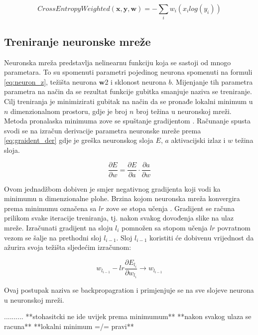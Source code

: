 \documentclass[times, utf8, zavrsni,numeric,pstricks]{fer}
\newcommand{\vect}[1]{\boldsymbol{#1}}
\begin{document}
\begin{equation}\label{eq:cross_entropy}
	CrossEntropyWeighted\left(\vect{x}, \vect{y},\vect{w}\right) =
		-\sum_i w_i \left( x_i log\left(y_i \right)\right)
\end{equation}

\subsection{Treniranje neuronske mreže}

Neuronska mreža predstavlja nelinearnu funkciju koja se sastoji od mnogo parametara. To su spomenuti parametri pojedinog neurona spomenuti na formuli \ref{eq:neuron_z}, težišta neurona $\vect{w}$2 i sklonost neurona $b$. Mijenjanje tih parametra parametra na način da se rezultat funkcije gubitka smanjuje naziva se treniranje. Cilj treniranja je minimizirati gubitak na način da se pronađe lokalni minimum u $n$ dimenzionalnom prostoru, gdje je broj $n$ broj težina u neuronskoj mreži. Metoda pronalaska minimuma zove se spuštanje gradijentom . Računanje spusta svodi se na izračun derivacije parametra neuronske mreže prema \ref{eq:graident_der} gdje je greška neuronskog sloja $E$, $a$ aktivacijski izlaz  i $w$ težina sloja.

\begin{equation}\label{eq:graident_der}
	\frac{\partial E}{\partial w} = \frac{\partial E}{\partial a} \cdot \frac{\partial a}{\partial w}
\end{equation}

Ovom jednadžbom dobiven je smjer negativnog gradijenta koji vodi ka minimumu n dimenzionalne plohe. Brzina kojom neuronska mreža konvergira prema minimumu označena sa $lr$ zove se stopa učenja . Gradijent se računa prilikom svake iteracije treniranja, tj. nakon svakog dovođenja slike na ulaz mreže. Izračunati gradijent na sloju $l_i$ pomnožen sa stopom učenja $lr$ povratnom vezom se šalje na prethodni sloj $l_{i-1}$. Sloj $l_{i-1}$ koristiti će dobivenu vrijednost da ažurira svoja težišta sljedećim izračunom:

\begin{equation}\label{eq:gradient_backprop_layer}
	 w_{l_{i-1}} - lr \frac{\partial E_{l_i}}{\partial w_{l_i}} \rightarrow w_{l_{i-1}}
\end{equation}

Ovaj postupak naziva se backpropagration i primjenjuje se na sve slojeve neurona u neuronskoj mreži.

..........
**stohasitcki ne ide uvijek prema minimumum**
**nakon svakog ulaza se racuna**
**lokalni minimum =/= pravi**
\end{document}
